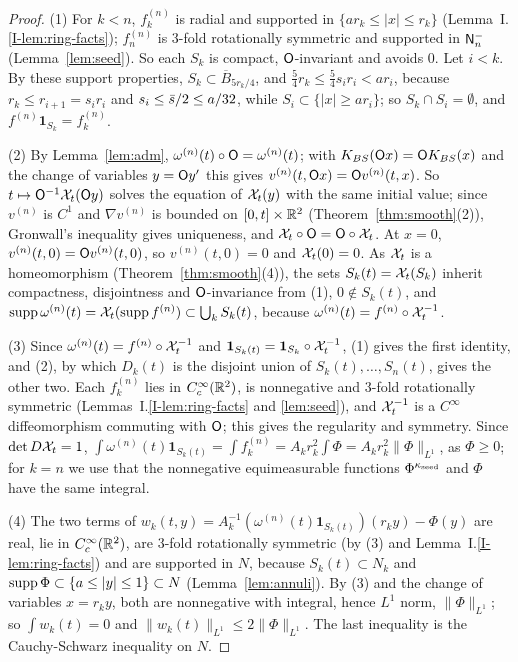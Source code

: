 \begin{proof}
(1) For $k<n$, $f^{(n)}_k$ is radial and supported in $\{ar_k\le|x|\le r_k\}$
(Lemma~I.\ref{I-lem:ring-facts}); $f^{(n)}_n$ is $3$-fold rotationally symmetric and supported in
$\mathsf{N}^{-}_n$ (Lemma~\ref{lem:seed}). So each $S_k$ is compact, $\mathsf{O}$-invariant and
avoids $0$. Let $i<k$. By these support properties, $S_k\subset\overline B_{5r_k/4}$, and
$\frac54r_k\le\frac54s_ir_i<ar_i$, because $r_k\le r_{i+1}=s_ir_i$ and $s_i\le\bar s/2\le a/32$, while
$S_i\subset\{|x|\ge ar_i\}$; so $S_k\cap S_i=\emptyset$, and
$f^{(n)}\mathbf 1_{S_k}=f^{(n)}_k$.

(2) By Lemma~\ref{lem:adm}, $\omega^{(n)}(t)\circ\mathsf{O}=\omega^{(n)}(t)$; with
$K_{BS}(\mathsf{O} x)=\mathsf{O}K_{BS}(x)$ and the change of variables $y=\mathsf{O} y'$ this gives
$v^{(n)}(t,\mathsf{O} x)=\mathsf{O} v^{(n)}(t,x)$. So $t\mapsto\mathsf{O}^{-1}\mathcal{X}_t(\mathsf{O} y)$
solves the equation of $\mathcal{X}_t(y)$ with the same initial value; since
$v^{(n)}$ is $C^1$ and $\nabla v^{(n)}$ is bounded on $[0,t]\times\mathbb{R}^2$
(Theorem~\ref{thm:smooth}\textup{(2)}), Gronwall's inequality gives uniqueness,
and $\mathcal{X}_t\circ\mathsf{O}=\mathsf{O}\circ\mathcal{X}_t$. At $x=0$, $v^{(n)}(t,0)=\mathsf{O}
v^{(n)}(t,0)$, so $v^{(n)}(t,0)=0$ and $\mathcal{X}_t(0)=0$. As $\mathcal{X}_t$ is a
homeomorphism (Theorem~\ref{thm:smooth}\textup{(4)}), the sets
$S_k(t)=\mathcal{X}_t(S_k)$ inherit compactness, disjointness and $\mathsf{O}$-invariance
from (1), $0\notin S_k(t)$, and
$\operatorname{supp}\omega^{(n)}(t)=\mathcal{X}_t(\operatorname{supp} f^{(n)})\subset\bigcup_kS_k(t)$, because
$\omega^{(n)}(t)=f^{(n)}\circ\mathcal{X}_t^{-1}$.

(3) Since $\omega^{(n)}(t)=f^{(n)}\circ\mathcal{X}_t^{-1}$ and
$\mathbf 1_{S_k(t)}=\mathbf 1_{S_k}\circ\mathcal{X}_t^{-1}$, (1) gives the first
identity, and (2), by which $D_k(t)$ is the disjoint union of
$S_k(t),\dots,S_n(t)$, gives the other two. Each $f^{(n)}_k$ lies in
$C_c^\infty(\mathbb{R}^2)$, is nonnegative and $3$-fold rotationally symmetric (Lemmas~I.\ref{I-lem:ring-facts}
and \ref{lem:seed}), and $\mathcal{X}_t^{-1}$ is
a $C^\infty$ diffeomorphism commuting with $\mathsf{O}$; this gives the regularity
and symmetry. Since $\det D\mathcal{X}_t=1$,
$\int\omega^{(n)}(t)\mathbf 1_{S_k(t)}=\int f^{(n)}_k=A_kr_k^2\int\Phi
=A_kr_k^2\|\Phi\|_{L^1}$, as $\Phi\ge0$; for $k=n$ we use that the nonnegative equimeasurable
functions $\Phi^{\kappa_{\mathrm{seed}}}$ and $\Phi$ have the same integral.

(4) The two terms of
$w_k(t,y)=A_k^{-1}(\omega^{(n)}(t)\mathbf 1_{S_k(t)})(r_ky)-\Phi(y)$ are real,
lie in $C_c^\infty(\mathbb{R}^2)$, are $3$-fold rotationally symmetric (by (3) and
Lemma~I.\ref{I-lem:ring-facts}) and are supported in $N$, because
$S_k(t)\subset N_k$ and $\operatorname{supp}\Phi\subset\{a\le|y|\le1\}\subset N$
(Lemma~\ref{lem:annuli}). By (3) and the change of variables $x=r_ky$, both are
nonnegative with integral, hence $L^1$ norm, $\|\Phi\|_{L^1}$; so $\int w_k(t)=0$ and $\|w_k(t)\|_{L^1}\le2\|\Phi\|_{L^1}$.
The last inequality is the Cauchy-Schwarz inequality on $N$.
\end{proof}

